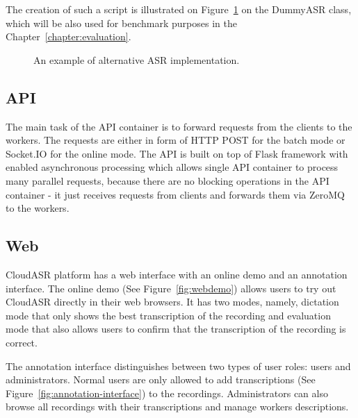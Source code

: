 The creation of such a script is illustrated on Figure~\ref{fig:dummyasr} on the DummyASR class,
  which will be also used for benchmark purposes in the Chapter~\ref{chapter:evaluation}.

\begin{figure}[h]
  

  \caption{An example of alternative ASR implementation.}
  \label{fig:dummyasr}
\end{figure}


\subsection{API}
The main task of the API container is to forward requests from the clients to the workers.
The requests are either in form of HTTP POST for the batch mode or Socket.IO for the online mode.
The API is built on top of Flask framework with enabled asynchronous processing
  which allows single API container to process many parallel requests,
  because there are no blocking operations in the API container -
  it just receives requests from clients and forwards them via ZeroMQ to the workers.


\subsection{Web}
CloudASR platform has a web interface with an online demo and an annotation interface.
The online demo (See Figure~\ref{fig:webdemo}) allows users to try out CloudASR directly in their web browsers.
It has two modes, namely, dictation mode that only shows the best transcription of the recording
  and evaluation mode that also allows users to confirm that the transcription of the recording is correct.


The annotation interface distinguishes between two types of user roles: users and administrators.
Normal users are only allowed to add transcriptions (See Figure~\ref{fig:annotation-interface}) to the recordings.
Administrators can also browse all recordings with their transcriptions and manage workers descriptions.





